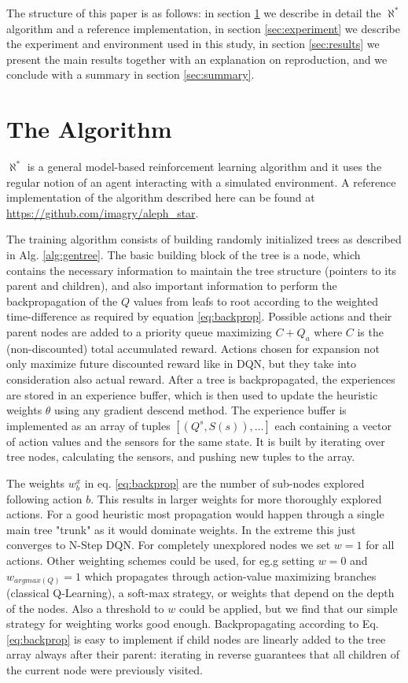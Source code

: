 \documentclass{article}
\newcommand{\alephstar}{$\aleph^*$ }
\begin{document}
The structure of this paper is as follows: in section \ref{sec:algorithm} we describe in detail the \alephstar algorithm and a reference implementation, in section \ref{sec:experiment} we describe the experiment and environment used in this study, in section \ref{sec:results} we present the main results together with an explanation on reproduction, and we conclude with a summary in section \ref{sec:summary}. 

\section{The Algorithm}
\label{sec:algorithm}

\alephstar is a general model-based reinforcement learning algorithm and it uses the regular notion of an agent interacting with a simulated environment. A reference implementation of the algorithm described here can be found at \url{https://github.com/imagry/aleph_star}.

The training algorithm consists of building randomly initialized trees as described in Alg. \ref{alg:gentree}. The basic building block of the tree is a node, which contains the necessary information to maintain the tree structure (pointers to its parent and children), and also important information to perform the backpropagation of the $Q$ values from leafs to root according to the weighted time-difference as required by equation \ref{eq:backprop}. Possible actions and their parent nodes are added to a priority queue maximizing $C+Q_a$ where $C$ is the (non-discounted) total accumulated reward. Actions chosen for expansion not only maximize future discounted reward like in DQN, but they take into consideration also actual reward. After a tree is backpropagated, the experiences are stored in an experience buffer, which is then used to update the heuristic weights $\theta$ using any gradient descend method. The experience buffer is implemented as an array of tuples $[(Q^s, S(s)), \ldots]$ each containing a vector of action values and the sensors for the same state. It is built by iterating over tree nodes, calculating the sensors, and pushing new tuples to the array.

The weights $w^x_b$ in eq. \ref{eq:backprop} are the number of sub-nodes explored following action $b$. This results in larger weights for more thoroughly explored actions. For a good heuristic most propagation would happen through a single main tree "trunk" as it would dominate weights. In the extreme this just converges to N-Step DQN. For completely unexplored nodes we set $w=1$ for all actions. Other weighting schemes could be used, for eg.g setting $w=0$ and $w_{argmax(Q)}=1$ which propagates through action-value maximizing branches (classical Q-Learning), a soft-max strategy, or weights that depend on the depth of the nodes. Also a threshold to $w$ could be applied, but we find that our simple strategy for weighting works good enough. Backpropagating according to Eq. \ref{eq:backprop} is easy to implement if child nodes are linearly added to the tree array always after their parent: iterating in reverse guarantees that all children of the current node were previously visited.
\end{document}
